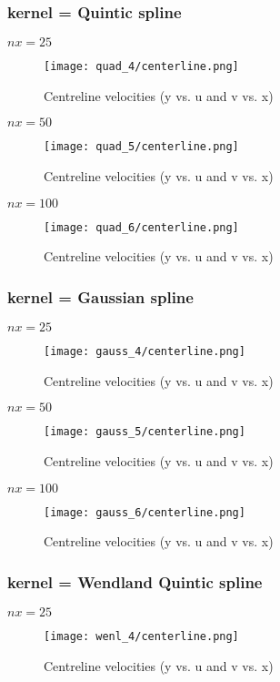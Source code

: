 \documentclass{article}
\begin{document}
\newpage
\subsubsection{kernel = Quintic spline}
$nx = 25 $
\\
\begin{figure}[H]   \label{figure}
\texttt{[image: quad\_4/centerline.png]}
\caption{Centreline velocities (y vs. u and v vs. x)}
\label{figure:}
\end{figure}

\newpage
$nx = 50 $
\\
\begin{figure}[H]   \label{figure}
\texttt{[image: quad\_5/centerline.png]}
\caption{Centreline velocities (y vs. u and v vs. x)}
\label{figure:}
\end{figure}

\newpage
$nx = 100 $
\\
\begin{figure}[H]   \label{figure}
\texttt{[image: quad\_6/centerline.png]}
\caption{Centreline velocities (y vs. u and v vs. x)}
\label{figure:}
\end{figure}

\newpage
\subsubsection{kernel = Gaussian spline}
$nx = 25 $
\\
\begin{figure}[H]   \label{figure}
\texttt{[image: gauss\_4/centerline.png]}
\caption{Centreline velocities (y vs. u and v vs. x)}
\label{figure:}
\end{figure}

\newpage
$nx = 50 $
\\
\begin{figure}[H]   \label{figure}
\texttt{[image: gauss\_5/centerline.png]}
\caption{Centreline velocities (y vs. u and v vs. x)}
\label{figure:}
\end{figure}

\newpage
$nx = 100 $
\\
\begin{figure}[H]   \label{figure}
\texttt{[image: gauss\_6/centerline.png]}
\caption{Centreline velocities (y vs. u and v vs. x)}
\label{figure:}
\end{figure}

\newpage
\subsubsection{kernel = Wendland Quintic spline}
$nx = 25 $
\\
\begin{figure}[H]   \label{figure}
\texttt{[image: wenl\_4/centerline.png]}
\caption{Centreline velocities (y vs. u and v vs. x)}
\label{figure:}
\end{figure}
\end{document}
